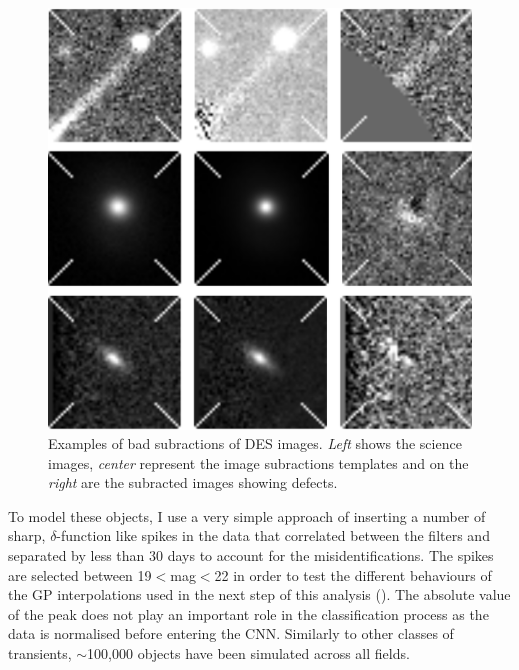 \begin{figure}
  \includegraphics[width=\textwidth]{Figures/Chapter5/BabSubs.png}
  \caption{Examples of bad subractions of DES images. \textit{Left} shows the science images, \textit{center} represent the image subractions templates and on the \textit{right} are the subracted images showing defects.}
  \label{fig:BadSubtractions}
\end{figure}

To model these objects, I use a very simple approach of inserting a number of sharp, $\delta$-function like spikes in the data that correlated between the filters and separated by less than 30 days to account for the misidentifications. The spikes are selected between 19$<$mag$<$22 in order to test the different behaviours of the GP interpolations used in the next step of this analysis (). The absolute value of the peak does not play an important role in the classification process as the data is normalised before entering the CNN. Similarly to other classes of transients, $\sim$100,000 objects have been simulated across all fields.

